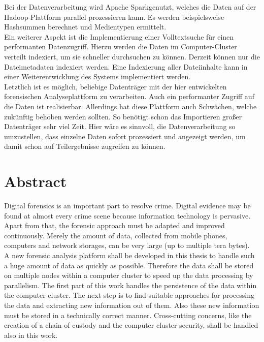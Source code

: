 \noindent
Bei der Datenverarbeitung wird Apache Spark\texttrademark\thinspace genutzt, welches die Daten auf der Hadoop-Plattform parallel prozessieren kann. Es werden beispielsweise Hashsummen berechnet und Medientypen ermittelt.\\
Ein weiterer Aspekt ist die Implementierung einer Volltextsuche für einen performanten Datenzugriff. Hierzu werden die Daten im Computer-Cluster verteilt indexiert, um sie schneller durchsuchen zu können. Derzeit können nur die Dateimetadaten indexiert werden. Eine Indexierung aller Dateiinhalte kann in einer Weiterentwicklung des Systems implementiert werden.\\

\noindent
Letztlich ist es möglich, beliebige Datenträger mit der hier entwickelten forensischen Analyseplattform zu verarbeiten. Auch ein performanter Zugriff auf die Daten ist realisierbar. Allerdings hat diese Plattform auch Schwächen, welche zukünftig behoben werden sollten. So benötigt schon das Importieren großer Datenträger sehr viel Zeit. Hier wäre es sinnvoll, die Datenverarbeitung so umzustellen, dass einzelne Daten sofort prozessiert und angezeigt werden, um damit schon auf Teilergebnisse zugreifen zu können.


\newpage
\section*{Abstract}
Digital forensics is an important part to resolve crime. Digital evidence may be found at almost every crime scene because information technology is pervasive. Apart from that, the forensic approach must be adapted and improved continuously. Merely the amount of data, collected from mobile phones, computers and network storages, can be very large (up to multiple tera bytes).\\

\noindent
A new forensic analysis platform shall be developed in this thesis to handle such a huge amount of data as quickly as possible. Therefore the data shall be stored on multiple nodes within a computer cluster to speed up the data processing by parallelism. The first part of this work handles the persistence of the data within the computer cluster. The next step is to find suitable approaches for processing the data and extracting new information out of them. Also these new information must be stored in a technically correct manner. Cross-cutting concerns, like the creation of a chain of custody and the computer cluster security, shall be handled also in this work.\\

